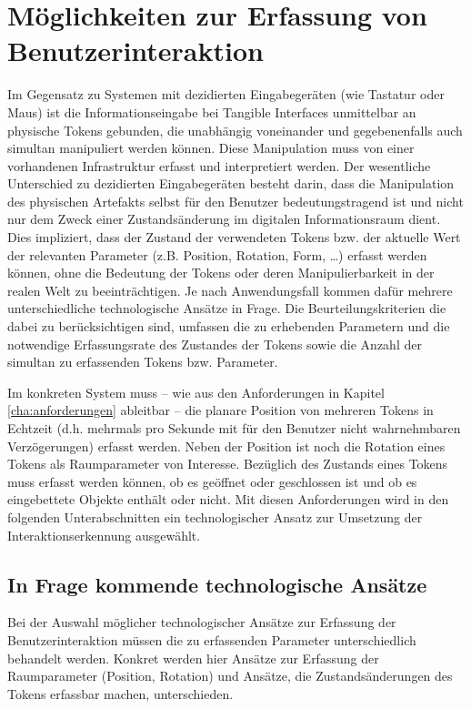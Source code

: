 \section{Möglichkeiten zur Erfassung von Benutzerinteraktion} %
\label{sec:möglichkeiten_zur_erfassung_von_benutzerinteraktion}

Im Gegensatz zu Systemen mit dezidierten Eingabegeräten (wie Tastatur oder Maus) ist die Informationseingabe bei Tangible Interfaces unmittelbar an physische Tokens gebunden, die unabhängig voneinander und gegebenenfalls auch simultan manipuliert werden können. Diese Manipulation muss von einer vorhandenen Infrastruktur erfasst und interpretiert werden. Der wesentliche Unterschied zu dezidierten Eingabegeräten besteht darin, dass die Manipulation des physischen Artefakts selbst für den Benutzer bedeutungstragend ist und nicht nur dem Zweck einer Zustandsänderung im digitalen Informationsraum dient. Dies impliziert, dass der Zustand der verwendeten Tokens bzw. der aktuelle Wert der relevanten Parameter (z.B. Position, Rotation, Form, \ldots) erfasst werden können, ohne die Bedeutung der Tokens oder deren Manipulierbarkeit in der realen Welt zu beeinträchtigen. Je nach Anwendungsfall kommen dafür mehrere unterschiedliche technologische Ansätze in Frage. Die Beurteilungskriterien die dabei zu berücksichtigen sind, umfassen die zu erhebenden Parametern und die notwendige Erfassungsrate des Zustandes der Tokens sowie die Anzahl der simultan zu erfassenden Tokens bzw. Parameter.

Im konkreten System muss -- wie aus den Anforderungen in Kapitel \ref{cha:anforderungen} ableitbar -- die planare Position von mehreren Tokens in Echtzeit (d.h. mehrmals pro Sekunde mit für den Benutzer nicht wahrnehmbaren Verzögerungen) erfasst werden. Neben der Position ist noch die Rotation eines Tokens als Raumparameter von Interesse. Bezüglich des Zustands eines Tokens muss erfasst werden können, ob es geöffnet oder geschlossen ist und ob es eingebettete Objekte enthält oder nicht. Mit diesen Anforderungen wird in den folgenden Unterabschnitten ein technologischer Ansatz zur Umsetzung der Interaktionserkennung ausgewählt.

\subsection{In Frage kommende technologische Ansätze} %
\label{sub:potentielle_technologische_ansätze}
Bei der Auswahl möglicher technologischer Ansätze zur Erfassung der Benutzerinteraktion müssen die zu erfassenden Parameter unterschiedlich behandelt werden. Konkret werden hier Ansätze zur Erfassung der Raumparameter (Position, Rotation) und Ansätze, die Zustandsänderungen des Tokens erfassbar machen, unterschieden. 

